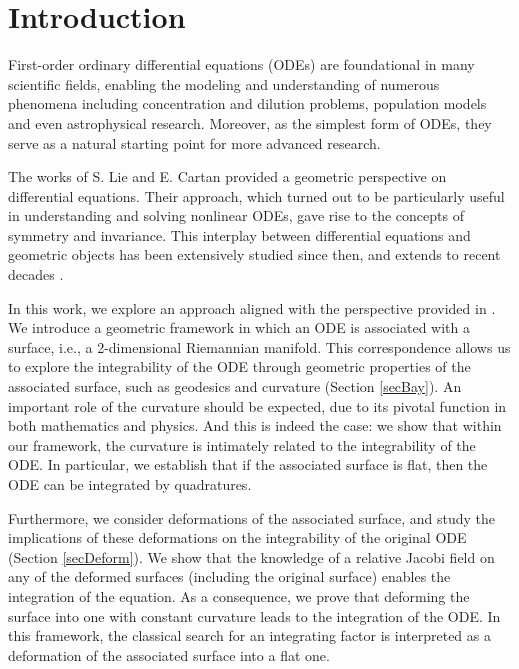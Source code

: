 \documentclass{article}
\theoremstyle{remark}
\theoremstyle{definition}
\begin{document}
\section{Introduction}

First-order ordinary differential equations (ODEs) are foundational in many scientific fields, enabling the modeling and understanding of numerous phenomena including concentration and dilution problems, population models and even astrophysical research. Moreover, as the simplest form of ODEs, they serve as a natural starting point for more advanced research.

The works of S. Lie and E. Cartan \cite{lie1888classification,cartan1899certaines,cartan1924varietes} provided a geometric perspective on differential equations. Their approach, which turned out to be particularly useful in understanding and solving nonlinear ODEs, gave rise to the concepts of symmetry and invariance. This interplay between differential equations and geometric objects has been extensively studied since then, and extends to recent decades \cite{stiller1981differential, crampin1996linear,frittelli2001differential,newman2003projective,nurowski2005differential,tsamparlis2010lie,doubrov2016geometry,Bayrakdar2018a,Bayrakdar2018,autonomous2ODE,integrationJacobifields}.    

In this work, we explore an approach aligned with the perspective provided in \cite{Bayrakdar2018a, Bayrakdar2018,autonomous2ODE,integrationJacobifields}. We introduce a geometric framework in which an ODE is associated with a surface, i.e., a 2-dimensional Riemannian manifold. This correspondence allows us to explore the integrability of the ODE through geometric properties of the associated surface, such as geodesics and curvature (Section \ref{secBay}). An important role of the curvature should be expected, due to its pivotal function in both mathematics and physics. And this is indeed the case: we show that within our framework, the curvature is intimately related to the integrability of the ODE. In particular, we establish that if the associated surface is flat, then the ODE can be integrated by quadratures. 

Furthermore, we consider deformations of the associated surface, and study the implications of these deformations on the integrability of the original ODE (Section \ref{secDeform}). We show that the knowledge of a relative Jacobi field on any of the deformed surfaces (including the original surface) enables the integration of the equation. As a consequence, we prove that deforming the surface into one with constant curvature leads to the integration of the ODE. In this framework, the classical search for an integrating factor is interpreted as a deformation of the associated surface into a flat one.
\end{document}
